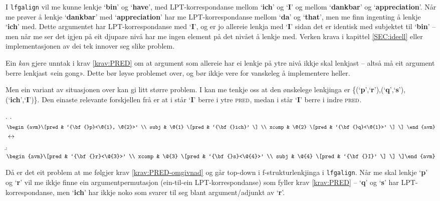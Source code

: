 \documentclass[11pt,a4paper,oneside,draft]{book}
\newcommand{\F}[2]{\textsc{#1}\ensuremath{_{#2}}}
\newcommand{\PRED}{\F{pred}{}}
\newcommand{\p}[1]{`\textbf{#1}'}
\begin{document}
 I \texttt{lfgalign} vil me kunne lenkje \p{bin} og \p{have}, med
 LPT-korrespondanse mellom \p{ich} og \p{I} og mellom \p{dankbar} og
 \p{appreciation}. Når me prøver å lenkje \p{dankbar} med
 \p{appreciation} har me LPT-korrespondanse mellom \p{da} og \p{that},
 men me finn ingenting å lenkje \p{ich} med. Dette argumentet har
 LPT-korrespondanse med \p{I}, og er jo allereie lenkja med \p{I}
 sidan det er identisk med subjektet til \p{bin} -- men når me ser det
 igjen på eit djupare nivå har me ingen element på det nivået å lenkje
 med. Verken krava i kapittel \ref{SEC:ideell} eller implementasjonen
 av dei tek innover seg slike problem.

 Ein \emph{kan} gjere unntak i krav \ref{krav:PRED} om at argument som
 allereie har ei lenkje på ytre nivå ikkje skal lenkjast -- altså må
 eit argument berre lenkjast «ein gong». Dette bør løyse problemet
 over, og bør ikkje vere for vanskeleg å implementere heller.

 Men ein variant av situasjonen over kan gi litt større problem. I
 \Next kan me tenkje oss at den ønskelege lenkjinga er
 \{(\p{p},\p{r}),(\p{q},\p{s}),(\p{ich},\p{I})\}. Den einaste
 relevante forskjellen frå \Last er at i \Last står \p{I} berre i ytre
 \PRED, medan i \Next står \p{I} berre i indre \PRED.

{\avmoptions{}
\ex. \a. $\begin{avm}\[pred & `{\bf{}p}<\@{1}, \@{2}>'  \\
     subj & \@{1} \[pred &  `{\bf{}ich}' \] \\
     xcomp & \@{2} \[pred & `{\bf{}q}<\@{1}>' \] \] \end{avm}$
     $\\\\\leftrightarrow$\\
     \b. $\begin{avm}\[pred & `{\bf{}r}<\@{3}>' \\
     xcomp & \@{3} \[pred & `{\bf{}s}<\@{4}>' \\
     subj & \@{4} \[pred &  `{\bf{}I}' \] \] \]\end{avm}$

}

 Då er det eit problem at me følgjer krav \ref{krav:PRED-omgivnad} og
 går top-down i f-strukturlenkjinga i \texttt{lfgalign}. Når me skal lenkje
 \p{p} og \p{r} vil me ikkje finne ein argumentpermutasjon
 (ein-til-ein LPT-korrespondanse) som fyller krav \ref{krav:PRED} --
 \p{q} og \p{s} har LPT-korrespondanse, men \p{ich} har ikkje noko som
 svarer til seg blant argument/adjunkt av \p{r}.
\end{document}
